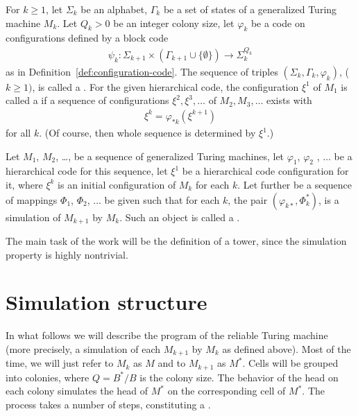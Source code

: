 \documentclass[12pt]{memoir}
\renewcommand{\ge}{\geq}
\def\B{B}
\begin{document}
\begin{definition}\label{def:hierarchical-code}
For \( k\ge 1 \), let \( \Sigma_k \) be an alphabet, \( \Gamma_k \) be
a set of states of a generalized Turing machine \( M_k \).
Let \( Q_k>0 \) be an integer colony size, let \( \varphi_k \)
be a code on configurations defined by a block code
  \begin{align*}
       \psi_k: \Sigma_{k+1}\times(\Gamma_{k+1}\cup\{\emptyset\})
       \rightarrow \Sigma_k^{Q_k}
  \end{align*}
as in Definition~\ref{def:configuration-code}.
The sequence of triples \( (\Sigma_k,\Gamma_k,  \varphi_k) \), (\( k\ge 1) \),  is
called a .
For the given hierarchical code, the configuration \( \xi^{1} \) of \( M_{1} \)
is called a  if a sequence
of configurations \( \xi^{2},\xi^{3},\dots \) of \( M_{2},M_{3},\dots \) exists with
\begin{align*}
 \xi^{k}=\varphi_{*k}(\xi^{k+1})
 \end{align*} 
for all \( k \).
(Of course, then whole sequence is determined by \( \xi^{1} \).)

Let \( M_1 \), \( M_2 \), \dots, be a sequence of generalized Turing machines,
let \( \varphi_{1} \), \( \varphi_{2} \) , \(\dots \) be a hierarchical code for this sequence,
let \( \xi^{1} \) be a hierarchical code configuration for it, where \( \xi^{k} \) is an
initial configuration of \( M_{k} \) for each \( k \).
Let further be a sequence of mappings \( \Phi_{1} \), \( \Phi_{2} \), \( \dots \) be
given such that for each \( k \), the pair \( (\varphi_{k*},\Phi_{k}^{*}) \),
is a simulation of \( M_{k+1} \) by \( M_{k} \).
Such an object is called a .
\end{definition}

The main task of the work will be the definition of a tower, since the simulation
property is highly nontrivial.


\section{Simulation structure}

In what follows we will describe the program of the reliable Turing machine
(more precisely, a simulation of each \( M_{k+1} \) by \( M_{k} \) as defined above).
Most of the time, we will just refer to \( M_{k} \) as \( M \) and to \( M_{k+1} \) as
\( M^{*} \).
Cells will be grouped into colonies, where  \( Q=\B^{*}/\B \) is the colony size.
The behavior of the head on
each colony simulates the head of \( M^{*} \) on the corresponding cell
of \( M^{*} \).
The process takes a number of steps, constituting a .
\end{document}
